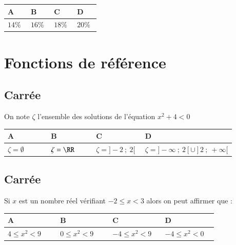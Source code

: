 \documentclass[oneside,12pt]{article}
\let\oldsection\section
\renewcommand{\section}{\newpage\oldsection}
\begin{document}
\begin{center}
	\renewcommand{\arraystretch}{1.35}
	\begin{tabular}{| P{0.22\linewidth} | P{0.22\linewidth} | P{0.22\linewidth} | P{0.22\linewidth} |} \hline
	A & B & C & D \\ \hline
	$14\%$ & $16\%$ & $18\%$ & $20\%$ \\ \hline
	\end{tabular}
\end{center}




\section{Fonctions de référence}

\subsection{Carrée}
On note $\zeta$ l'ensemble des solutions de l'équation $x^2+4<0$

\begin{center}
	\renewcommand{\arraystretch}{1.35}
	\begin{tabular}{| P{0.22\linewidth} | P{0.22\linewidth} | P{0.22\linewidth} | P{0.22\linewidth} |} \hline
	A & B & C & D \\ \hline
	\rule{0pt}{5mm}
	$\zeta=\emptyset$ & $\zeta=\RR$ & $\zeta=]-2~;~2[$ & $\zeta=]-\infty~;~2[\cup]2~;~+\infty[$ \\[2pt] \hline
	\end{tabular}
\end{center}



\subsection{Carrée}
Si $x$ est un nombre réel vérifiant $-2\leq x < 3$ alors on peut affirmer que :

\begin{center}
	\renewcommand{\arraystretch}{1.35}
	\begin{tabular}{| P{0.22\linewidth} | P{0.22\linewidth} | P{0.22\linewidth} | P{0.22\linewidth} |} \hline
	A & B & C & D \\ \hline
	\rule{0pt}{5mm}
	$4\leq x^2 < 9$ & $0\leq x^2 < 9$ & $-4 \leq x^2 < 9$ & $-4 \leq x^2 <0$ \\ \hline
	\end{tabular}
\end{center}
\end{document}
